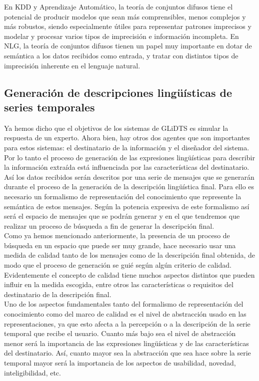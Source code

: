 \documentclass[10pt,a4paper]{article}
\begin{document}
En KDD y Aprendizaje Automático, la teoría de conjuntos difusos tiene el potencial de producir modelos que sean más comprensibles, menos complejos y más robustos, siendo especialmente útiles para representar patrones imprecisos y modelar y procesar varios tipos de imprecisión e información incompleta. En NLG, la teoría de conjuntos difusos tienen un papel muy importante en dotar de semántica a los datos recibidos como entrada, y tratar con distintos tipos de imprecisión inherente en el lenguaje natural.

\subsection{Generación de descripciones lingüísticas de series temporales}

Ya hemos dicho que el objetivos de los sistemas de GLiDTS es simular la respuesta de un experto. Ahora bien, hay otros dos agentes que son importantes para estos sistemas: el destinatario de la información y el diseñador del sistema. Por lo tanto el proceso de generación de las expresiones lingüísticas para describir la información extraída está influenciada por las características del destinatario.\\

Así los datos recibidos serán descritos por una serie de mensajes que se generarán durante el proceso de la generación de la descripción lingüística final. Para ello es necesario un formalismo de representación del conocimiento que represente la semántica de estos mensajes. Según la potencia expresiva de este formalismo así será el espacio de mensajes que se podrán generar y en el que tendremos que realizar un proceso de búsqueda a fin de generar la descripción final.\\

Como ya hemos mencionado anteriormente, la presencia de un proceso de búsqueda en un espacio que puede ser muy grande, hace necesario usar una medida de calidad tanto de los mensajes como de la descripción final obtenida, de modo que el proceso de generación se guié según algún criterio de calidad. Evidentemente el concepto de calidad tiene muchos aspectos distintos que pueden influir en la medida escogida, entre otros las características o requisitos del destinatario de la descripción final.\\

Uno de los aspectos fundamentales tanto del formalismo de representación del conocimiento como del marco de calidad es el nivel de abstracción usado en las representaciones, ya que esto afecta a la percepción o a la descripción de la serie temporal que recibe el usuario. Cuanto más bajo sea el nivel de abstracción menor será la importancia de las expresiones lingüísticas y de las características del destinatario. Así, cuanto mayor sea la abstracción que sea hace sobre la serie temporal mayor será la importancia de los aspectos de usabilidad, novedad, inteligibilidad, etc.\\
\end{document}
